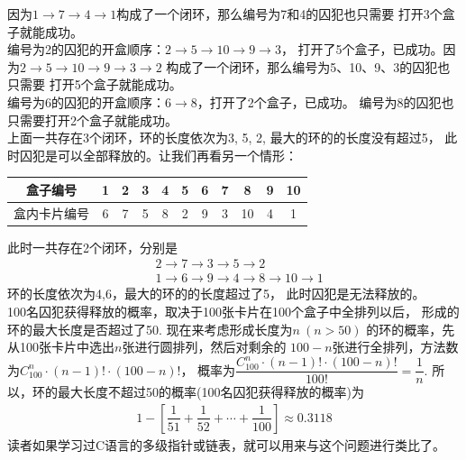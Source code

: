 \begin{enumerate}[label={【\textbf{例\thechapter.\arabic*}】},
 leftmargin=\inteval{\myenumleftmargin}pt,
 itemsep=\inteval{\myenumitempsep}pt,
 itemindent=\inteval{\myenumitemindent}pt]
因为$ 1 \to 7 \to 4 \to 1$构成了一个闭环，那么编号为7和4的囚犯也只需要
打开3个盒子就能成功。\\
编号为2的囚犯的开盒顺序：$ 2 \to 5 \to 10 \to 9 \to 3 $，
打开了5个盒子，已成功。因为$ 2 \to 5 \to 10 \to 9 \to 3 \to 2$
构成了一个闭环，那么编号为5、10、9、3的囚犯也只需要
打开5个盒子就能成功。\\
编号为6的囚犯的开盒顺序：$ 6 \to 8 $，打开了2个盒子，已成功。
编号为8的囚犯也只需要打开2个盒子就能成功。\\
上面一共存在3个闭环，环的长度依次为3, 5, 2, 最大的环的的长度没有超过5，
此时囚犯是可以全部释放的。让我们再看另一个情形：
\begin{table}[H] 
    \centering
    \renewcommand\arraystretch{1}
    \begin{tabular}{|c|c|c|c|c|c|c|c|c|c|c|}
        \hline
        盒子编号  & 1 & 2 & 3 & 4 & 5 & 6 & 7 & 8 & 9 & 10 \\
        \hline
        盒内卡片编号  & 6 & 7 & 5 & 8 & 2 & 9 & 3 & 10 & 4 & 1  \\
        \hline
    \end{tabular}
\end{table}
\vspace{-4mm}
此时一共存在2个闭环，分别是
\begin{align*}
    & 2 \to 7 \to 3 \to 5 \to 2 \\
    & 1 \to 6 \to 9 \to 4 \to 8 \to 10 \to 1
\end{align*}
环的长度依次为4,6，最大的环的的长度超过了5，
此时囚犯是无法释放的。\\
100名囚犯获得释放的概率，取决于100张卡片在100个盒子中全排列以后，
形成的环的最大长度是否超过了50. 现在来考虑形成长度为$n\ (n>50)$
的环的概率，先从100张卡片中选出$n$张进行圆排列，然后对剩余的
$100-n$张进行全排列，方法数为$C_{100}^n\cdot (n-1)!\cdot (100-n)!$，
概率为$ \dfrac{C_{100}^n\cdot (n-1)!\cdot (100-n)!}{100!}=\dfrac{1}{n} $.
所以，环的最大长度不超过50的概率(100名囚犯获得释放的概率)为
\begin{gather*}
    1-\left[\dfrac{1}{51}+\dfrac{1}{52}+\cdots+
    \dfrac{1}{100}\right]\approx 0.3118
\end{gather*}
读者如果学习过C语言的多级指针或链表，就可以用来与这个问题进行类比了。


\end{enumerate}

